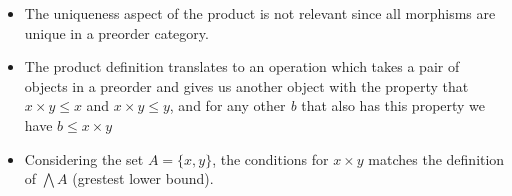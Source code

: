 \begin{itemize}
    \item  The uniqueness aspect of the product is not relevant since all morphisms are unique in a preorder category.
    \item The product definition translates to an operation which takes a pair of objects in a preorder and gives us another object with the property that $x \times y \leq x$ and $x \times y \leq y$, and for any other \emph{b} that also has this property we have $b \leq x\times y$
    \item Considering the set $A=\{x,y\}$, the conditions for $x \times y$ matches the definition of $\bigwedge A$ (grestest lower bound).
  \end{itemize}
